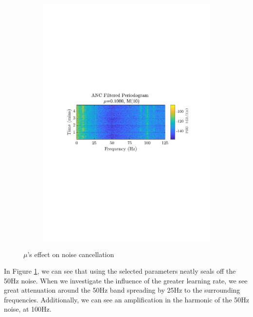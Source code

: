 \documentclass[12pt]{article}
\numberwithin{equation}{section}
\begin{document}
\begin{figure}[H]
\begin{subfigure}{0.49\textwidth}
					\includegraphics[trim={2.2cm 11.2cm 2.70cm  11.2cm}, clip, width=\textwidth]{../MATLAB/figures/q2_3d_fig05.pdf} 
					\captionsetup{justification=centering}
				\end{subfigure}
				\captionsetup{justification=centering}
				\caption{$\mu$'s effect on noise cancellation}
				\label{fig: 2-3d}
			\end{figure}
		
			In Figure \ref{fig: 2-3d}, we can see that using the selected parameters neatly seals off the 50Hz noise. When we investigate the influence of the greater learning rate, we see great attenuation around the 50Hz band spreading by 25Hz to the surrounding frequencies. Additionally, we can see an amplification in the harmonic of the 50Hz noise, at 100Hz. \\
			
\end{document}

